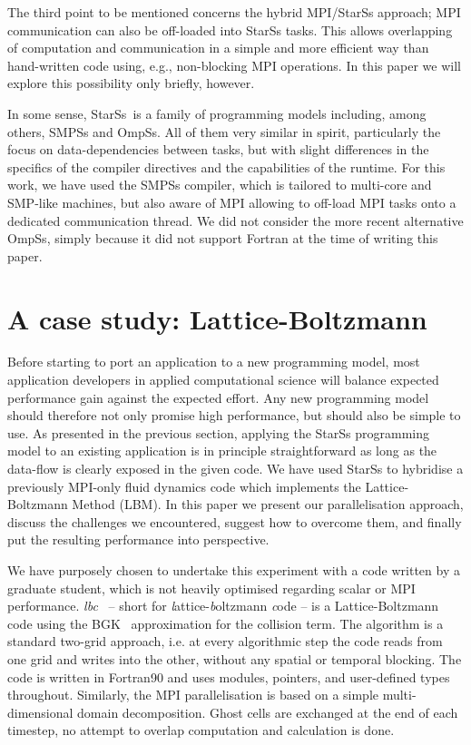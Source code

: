 \documentclass[conference]{IEEEtran}
\newcommand{\starss}{{StarSs}}
\newcommand{\lbc}{{\em lbc}}
\begin{document}
The third point to be mentioned concerns the hybrid MPI/\starss{}
approach; MPI communication can also be off-loaded into \starss{}
tasks. This allows overlapping of computation and communication in a
simple and more efficient way than hand-written code using,
e.g.,  non-blocking MPI operations. In this paper we will explore this
possibility only briefly, however.

In some sense, \starss\ is a family of programming models including,
among others, SMPSs and OmpSs. All of them very similar in spirit,
particularly the focus on data-dependencies between tasks, but with
slight differences in the specifics of the compiler directives and the
capabilities of the runtime. For this work, we have used the SMPSs
compiler, which is tailored to multi-core and SMP-like machines, but
also aware of MPI allowing to off-load MPI tasks onto a dedicated
communication thread. We did not consider the more recent alternative
OmpSs, simply because it did not support Fortran at the time of
writing this paper.


\section{A case study: Lattice-Boltzmann}
Before starting to port an application to a new programming model,
most application developers in applied computational science will
balance expected performance gain against the expected effort. Any new
programming model should therefore not only promise high performance,
but should also be simple to use.  As presented in the previous section,
applying the \starss{} programming model to an existing application
is in principle straightforward as long as the data-flow is clearly
exposed in the given code. We have used \starss{} to
hybridise a previously MPI-only fluid dynamics code which implements
the Lattice-Boltzmann Method (LBM). In this paper we present our
parallelisation approach, discuss the challenges we encountered,
suggest how to overcome them, and finally put the resulting
performance into perspective.

We have purposely chosen to undertake this experiment with a code
written by a graduate student, which is not heavily optimised
regarding scalar or MPI performance. \lbc{}~\cite{HKR11} -- short for {\em
  l}attice-{\em b}oltzmann {\em c}ode -- is a Lattice-Boltzmann code
using the BGK~\cite{BGK54} approximation for the collision term. The
algorithm is a standard two-grid approach, i.e. at every algorithmic step 
the code reads from one grid and writes into the other, without any spatial
or temporal blocking. The code is written in Fortran90 and uses
modules, pointers, and user-defined types throughout. Similarly, the
MPI parallelisation is based on a simple multi-dimensional domain
decomposition. Ghost cells are exchanged at the end of each timestep,
no attempt to overlap computation and calculation is done.
\end{document}
